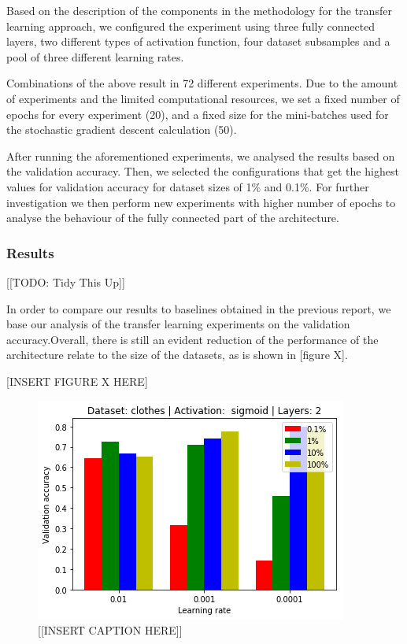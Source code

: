 \documentclass{article}
\begin{document}
Based on the description of the components in the methodology for the transfer learning approach, we configured the experiment using three fully connected layers, two different types of activation function, four dataset subsamples and a pool of three different learning rates.

Combinations of the above result in 72 different experiments. Due to the amount of experiments and the limited computational resources, we set a fixed number of epochs for every experiment (20), and a fixed size for the mini-batches used for the stochastic gradient descent calculation (50).

After running the aforementioned experiments, we analysed the results based on the validation accuracy. Then, we selected the configurations that get the highest values for validation accuracy for dataset sizes of 1\% and 0.1\%. For further investigation we then perform new experiments with higher number of epochs to analyse the behaviour of the fully connected part of the architecture.

\subsubsection{\textbf{Results}}

[[TODO: Tidy This Up]]

In order to compare our results to baselines obtained in the previous report, we base our analysis of the transfer learning experiments on the validation accuracy.Overall, there is still an evident reduction of the performance of the architecture relate to the size of the datasets, as is shown in [figure X].

[INSERT FIGURE X HERE]

\begin{figure}[tb]
    \vskip 5mm
        \begin{center}
            \includegraphics[scale=0.5]{accuracy_reduction_00.png}
            \caption{[[INSERT CAPTION HERE]]}
            \label{fig:2}
        \end{center}
    \vskip -5mm
\end{figure}
\end{document}
